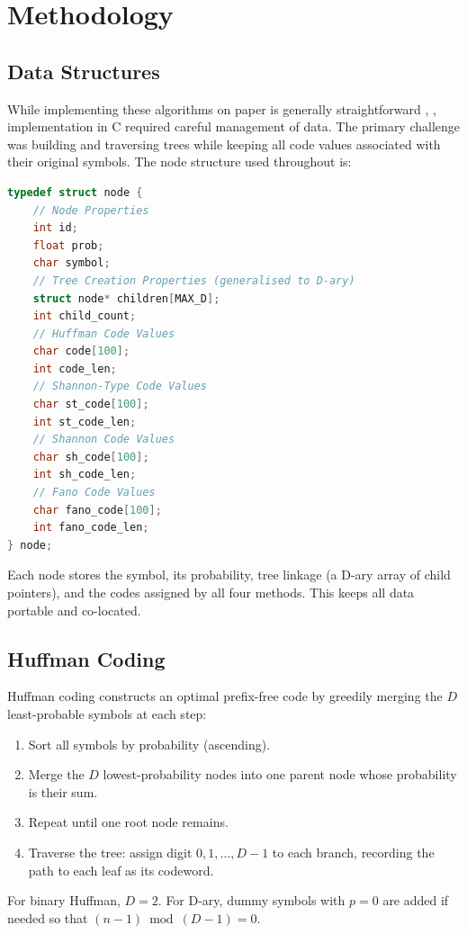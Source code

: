 \documentclass{AnantDocumentation}
\begin{document}
\section{Methodology}

\subsection{Data Structures}
While implementing these algorithms on paper is generally straightforward \cite{Geeks4Geeks_Huffman}, \cite{Geeks4Geeks_BinTree}, implementation in C required careful management of data. The primary challenge was building and traversing trees while keeping all code values associated with their original symbols. The node structure used throughout is:

\begin{lstlisting}[language=C]
typedef struct node {
    // Node Properties
    int id;
    float prob;
    char symbol;
    // Tree Creation Properties (generalised to D-ary)
    struct node* children[MAX_D];
    int child_count;
    // Huffman Code Values
    char code[100];
    int code_len;
    // Shannon-Type Code Values
    char st_code[100];
    int st_code_len;
    // Shannon Code Values
    char sh_code[100];
    int sh_code_len;
    // Fano Code Values
    char fano_code[100];
    int fano_code_len;
} node;
\end{lstlisting}

Each node stores the symbol, its probability, tree linkage (a D-ary array of child pointers), and the codes assigned by all four methods. This keeps all data portable and co-located.

\subsection{Huffman Coding}
Huffman coding constructs an optimal prefix-free code by greedily merging the $D$ least-probable symbols at each step:
\begin{enumerate}
	\item Sort all symbols by probability (ascending).
	\item Merge the $D$ lowest-probability nodes into one parent node whose probability is their sum.
	\item Repeat until one root node remains.
	\item Traverse the tree: assign digit $0, 1, \ldots, D{-}1$ to each branch, recording the path to each leaf as its codeword.
\end{enumerate}
For binary Huffman, $D=2$. For D-ary, dummy symbols with $p=0$ are added if needed so that $(n-1) \bmod (D-1) = 0$.
\end{document}
